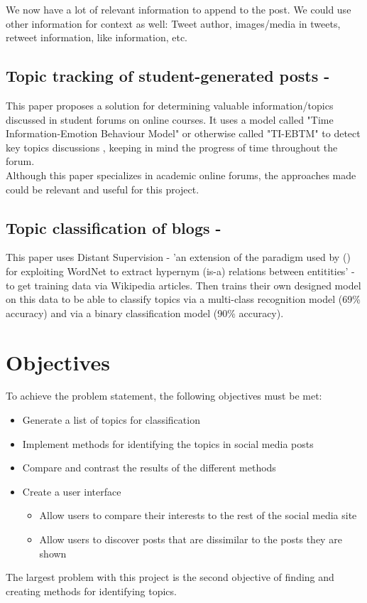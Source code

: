 We now have a lot of relevant information to append to the post. We could use other information for context as well: Tweet author,
images/media in tweets, retweet information, like information, etc.

\subsection{Topic tracking of student-generated posts - \cite{TopicTracking}}
This paper proposes a solution for determining valuable information/topics discussed in student forums on online courses.
It uses a model called "Time Information-Emotion Behaviour Model" or otherwise called "TI-EBTM" to detect key topics discussions
, keeping in mind the progress of time throughout the forum.\\
Although this paper specializes in academic online forums, the approaches made could be relevant and useful for this project.

\subsection{Topic classification of blogs - \cite{husby2012topic}}
This paper uses Distant Supervision - 'an extension of the paradigm used by (\cite{snow}) for exploiting WordNet to extract hypernym (is-a) relations between entitities'
- to get training data via Wikipedia articles. Then trains their own designed model on this data to be able to classify topics via a
multi-class recognition model (69\% accuracy) and via a binary classification model (90\% accuracy).

\section{Objectives}
To achieve the problem statement, the following objectives must be met:
\begin{itemize}
    \item Generate a list of topics for classification
    \item Implement methods for identifying the topics in social media posts
    \item Compare and contrast the results of the different methods
    \item Create a user interface
    \begin {itemize}
        \item Allow users to compare their interests to the rest of the social media site
        \item Allow users to discover posts that are dissimilar to the posts they are shown
    \end{itemize}
\end{itemize}
The largest problem with this project is the second objective of finding and creating methods for identifying topics.